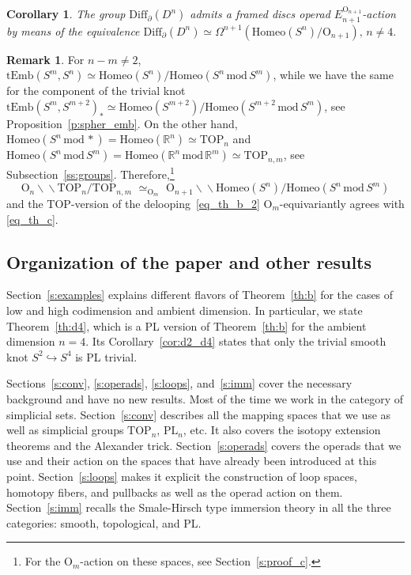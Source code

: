 \documentclass[11pt]{amsart}
\newtheorem{corollary}[theorem]{Corollary}
\theoremstyle{definition}
\newtheorem{remark}[theorem]{Remark}
\newcommand{\R}{{\mathbb R}}
\newcommand{\tEmb}{\mathrm{tEmb}}
\newcommand{\Diffn}{\mathrm{Diff}_\partial(D^n)}
\newcommand{\Homeo}{\mathrm{Homeo}}
\newcommand{\PL}{\mathrm{PL}}
\newcommand{\TOP}{\mathrm{TOP}}
\newcommand{\OO}{\mathrm{O}}
\newcommand{\mmod}{\,\mathrm{mod}\,}
\newcommand{\bbslash}{\backslash\!\!\backslash}
\newcommand\rth{\refstepcounter{equation}}
\newcommand\numb{\rth{\rm \theequation}}
\numberwithin{equation}{section}
\begin{document}
\begin{corollary}\label{cor:dif_fr_discs}
The group $\Diffn$ admits a  framed discs operad
$E_{n+1}^{\OO_{n+1}}$-action  by means of the equivalence
$\Diffn\simeq \Omega^{n+1}\left(\Homeo(S^n)/\OO_{n+1}\right),\,n\neq 4.$
\end{corollary}

 \begin{remark}\label{r:deloop}
For $n-m\neq 2$, $\tEmb(S^m,S^n)\simeq \Homeo(S^n)/\Homeo(S^n \mmod S^m)$, while we have the same for the component
of the trivial knot $\tEmb(S^m,S^{m+2})_*
\simeq \Homeo(S^{m+2})/\Homeo(S^{m+2}\mmod S^m)$, see Proposition~\ref{p:spher_emb}. On the other hand, $\Homeo(S^n\mmod *)=\Homeo(\R^n)\simeq\TOP_n$ and $\Homeo(S^n\mmod S^m)=\Homeo(\R^n\mmod \R^m)\simeq\TOP_{n,m}$, see Subsection~\ref{ss:groups}. Therefore,\footnote{For the
$\OO_m$-action on these spaces, see Section~\ref{s:proof_c}.}
\[
\OO_n\bbslash\TOP_n/\TOP_{n,m}\,\, \simeq_{\OO_m} \,\, \OO_{n+1}\bbslash\Homeo(S^n)/\Homeo(S^n\mmod S^m)
\]
and the $\TOP$-version of the delooping~\eqref{eq_th_b_2} $\OO_m$-equivariantly agrees with \eqref{eq_th_c}.
\end{remark}

\subsection{Organization of the paper and other results}\label{ss:org}

Section~\ref{s:examples} explains different flavors of Theorem~\ref{th:b} for the cases of low and high codimension and ambient dimension.  In particular, we state  Theorem~\ref{th:d4}, 
which is a PL version of Theorem~\ref{th:b} for the ambient dimension $n=4$. Its Corollary~\ref{cor:d2_d4} states that only the trivial smooth knot $S^2\hookrightarrow S^4$ is PL trivial.

Sections~\ref{s:conv}, \ref{s:operads}, \ref{s:loops}, and~\ref{s:imm} cover the necessary background and have no new results. Most of the time we work in the category of simplicial sets. Section~\ref{s:conv}
describes all the mapping spaces that we use as well as simplicial groups $\TOP_n$, $\PL_n$, etc. It also covers the isotopy extension theorems and the Alexander trick. 
Section~\ref{s:operads} covers the operads that we use and their action on the spaces that have already been introduced at this point. Section~\ref{s:loops} makes it explicit the construction of loop spaces,
homotopy fibers, and pullbacks as well as the operad action on them. Section~\ref{s:imm} recalls the Smale-Hirsch type immersion theory in all the three categories: smooth, topological, and PL.
\end{document}
